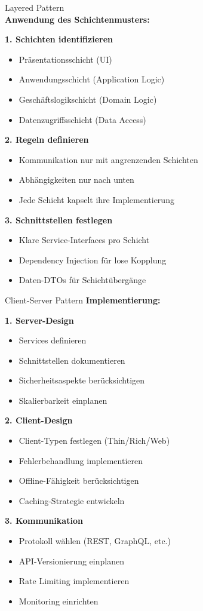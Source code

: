 \begin{KR}{Layered Pattern}\\
\textbf{Anwendung des Schichtenmusters:}

\textbf{1. Schichten identifizieren}
\begin{itemize}
    \item Präsentationsschicht (UI)
    \item Anwendungsschicht (Application Logic)
    \item Geschäftslogikschicht (Domain Logic)
    \item Datenzugriffsschicht (Data Access)
\end{itemize}

\textbf{2. Regeln definieren}
\begin{itemize}
    \item Kommunikation nur mit angrenzenden Schichten
    \item Abhängigkeiten nur nach unten
    \item Jede Schicht kapselt ihre Implementierung
\end{itemize}

\textbf{3. Schnittstellen festlegen}
\begin{itemize}
    \item Klare Service-Interfaces pro Schicht
    \item Dependency Injection für lose Kopplung
    \item Daten-DTOs für Schichtübergänge
\end{itemize}
\end{KR}

\begin{KR}{Client-Server Pattern}
\textbf{Implementierung:}

\textbf{1. Server-Design}
\begin{itemize}
    \item Services definieren
    \item Schnittstellen dokumentieren
    \item Sicherheitsaspekte berücksichtigen
    \item Skalierbarkeit einplanen
\end{itemize}

\textbf{2. Client-Design}
\begin{itemize}
    \item Client-Typen festlegen (Thin/Rich/Web)
    \item Fehlerbehandlung implementieren
    \item Offline-Fähigkeit berücksichtigen
    \item Caching-Strategie entwickeln
\end{itemize}

\textbf{3. Kommunikation}
\begin{itemize}
    \item Protokoll wählen (REST, GraphQL, etc.)
    \item API-Versionierung einplanen
    \item Rate Limiting implementieren
    \item Monitoring einrichten
\end{itemize}
\end{KR}

